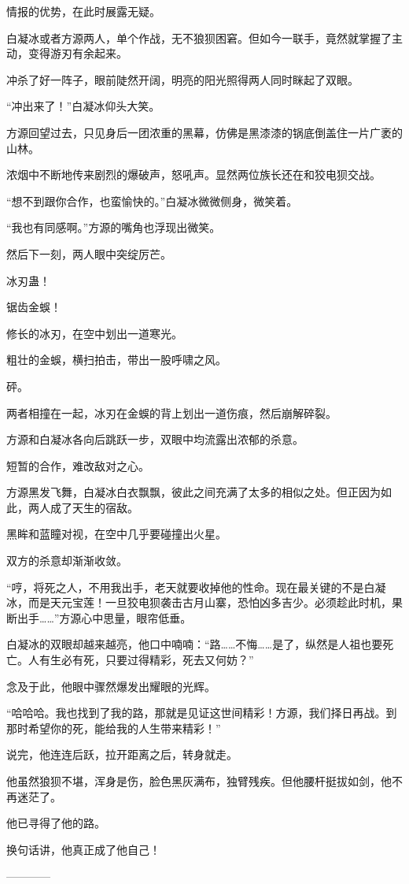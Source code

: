 \begin{this_body}
情报的优势，在此时展露无疑。

白凝冰或者方源两人，单个作战，无不狼狈困窘。但如今一联手，竟然就掌握了主动，变得游刃有余起来。

冲杀了好一阵子，眼前陡然开阔，明亮的阳光照得两人同时眯起了双眼。

“冲出来了！”白凝冰仰头大笑。

方源回望过去，只见身后一团浓重的黑幕，仿佛是黑漆漆的锅底倒盖住一片广袤的山林。

浓烟中不断地传来剧烈的爆破声，怒吼声。显然两位族长还在和狡电狈交战。

“想不到跟你合作，也蛮愉快的。”白凝冰微微侧身，微笑着。

“我也有同感啊。”方源的嘴角也浮现出微笑。

然后下一刻，两人眼中突绽厉芒。

冰刃蛊！

锯齿金蜈！

修长的冰刃，在空中划出一道寒光。

粗壮的金蜈，横扫拍击，带出一股呼啸之风。

砰。

两者相撞在一起，冰刃在金蜈的背上划出一道伤痕，然后崩解碎裂。

方源和白凝冰各向后跳跃一步，双眼中均流露出浓郁的杀意。

短暂的合作，难改敌对之心。

方源黑发飞舞，白凝冰白衣飘飘，彼此之间充满了太多的相似之处。但正因为如此，两人成了天生的宿敌。

黑眸和蓝瞳对视，在空中几乎要碰撞出火星。

双方的杀意却渐渐收敛。

“哼，将死之人，不用我出手，老天就要收掉他的性命。现在最关键的不是白凝冰，而是天元宝莲！一旦狡电狈袭击古月山寨，恐怕凶多吉少。必须趁此时机，果断出手……”方源心中思量，眼帘低垂。

白凝冰的双眼却越来越亮，他口中喃喃：“路……不悔……是了，纵然是人祖也要死亡。人有生必有死，只要过得精彩，死去又何妨？”

念及于此，他眼中骤然爆发出耀眼的光辉。

“哈哈哈。我也找到了我的路，那就是见证这世间精彩！方源，我们择日再战。到那时希望你的死，能给我的人生带来精彩！”

说完，他连连后跃，拉开距离之后，转身就走。

他虽然狼狈不堪，浑身是伤，脸色黑灰满布，独臂残疾。但他腰杆挺拔如剑，他不再迷茫了。

他已寻得了他的路。

换句话讲，他真正成了他自己！

------------

\end{this_body}

